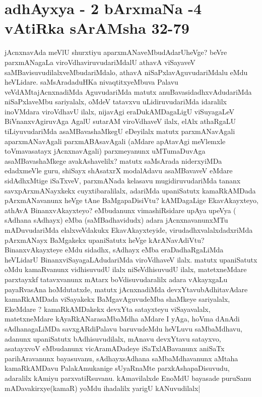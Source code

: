 
\section*{adhAyxya - 2 bArxmaNa -4 vAtiRka sArAMsha 32-79}


\begin{artha}
jAcnxnavAda meVlU shurxtiyu aparxmANaveMbudAdarUheVge? beVre
parxmANagaLa viroVdhaviruvudariMdalU athavA viSayaveV
saMBavisuvudilalxveMbudariMdalo, athavA niSaPxlavAguvudariMdalu eMdu
heVLidare. saMsAradaduHKa nivaqtitxyeMbuva Palavu veVdAMtajAcnxnadiMda
AguvudariMda matutx anuBavasidadhxvAdudariMda niSaPxlaveMbu
sariyalalx, oMdeV tatavxvu uLidiruvudariMda idaralilx inoVMdara
viroVdhavU ilalx, nijavAgi eraDukAMDagaLigU viSuyagaLeV
BiVnanxvAgiruvAga AgalU sutarAM viroVdhaveV ilalx, elAlx athaRgaLU
tiLiyuvudariMda asaMBavashaMkegU eDeyilalx matutx parxmANavAgali
aparxmANavAgali parxmABAsavAgali (aMdare apAtavAgi meVlemxle
toVmavasatayx jAcnxnavAgali) parxmeyanunx uMTumaDuvAga
asaMBavashaMkege avakAshavelilx? matutx saMsArada niderxyiMDa
edadxmeVle guru, shiSayx shAsatxrX modalAdavu asaMBavaveV eMdare
sidAdhxMtige iSaTxveV, parxmANada kelasavu mugidiruvudariMda tananx
savxpArxmANayxkekx cuyxtibaralilalx, adariMda upaniSatutx kamaRkAMDada
pArxmANavanunx heVge tAne BaMgapaDisiVtu? kAMDagaLige EkavAkayxteyo,
athAvA BinanxvAkayxteyo? eMbudanunx vimashiRsidare upAya upeVya (
sAdhana sAdhayx) eMba (saMBadhavidudx) adara jAcnxnavanunxMTu
mADuvudariMda elalxveVdakukx EkavAkayxteyide, virudadhxvalalxdadxriMda
pArxmANayx BaMgakekx upaniSatutx heVge kArANavAdiVtu?
BinanxvAkayxteye eMdu sidadhx, sAdhayx eMba eraDadhaRgaLiMda heVLidarU
BinanxviSayagaLAdudariMda viroVdhaveV ilalx. matutx upaniSatutx oMdu
kamaRvanunx vidhisuvudU ilalx niSeVdhisuvudU ilalx, matetxneMdare
parxtayxkf tatavxvanunx mAtarx boVdisuvudaralilx adara vAkayxgaLu
payaRvasAna hoMdutatxde, matutx jAcnxnadiMda devxYtavubAdhitavAdare
kamaRkAMDada viSayakekx BaMgavAguvudeMba shaMkeye sariyalalx, EkeMdare
? kamaRkAMDakekx devxYta satayxteyu viSayavalalx, matetxneMdare
kAyaRkANarasaMbaMdha aMdare I yAga, hoVma dAnAdi sAdhanagaLiMDa
savxgARdiPalavu baruvudeMdu heVLuvu saMbaMdhavu, adanunx upaniSatutx
bAdhisuvudilalx, mAnavu devxYtavu satayxvo, asatayxvoV eMbudanunx
vicAramADadeye iSaTxlABavanunx aniSaTx parihAravanunx bayasuvanu,
sAdhayxsAdhana saMbaMdhavanunx aMtaha kamaRkAMDavu PalakAmukanige
sUyaRnaMte parxkAshapaDisuvudu, adaralilx  kAmiyu parxvatiRsuvanu.
kAmavilalxde EnoMdU bayasade puruSanu mADavakirxye(kamaR) yoMdu
ihadalilx yarigU kANuvudilalx|
\end{artha}

